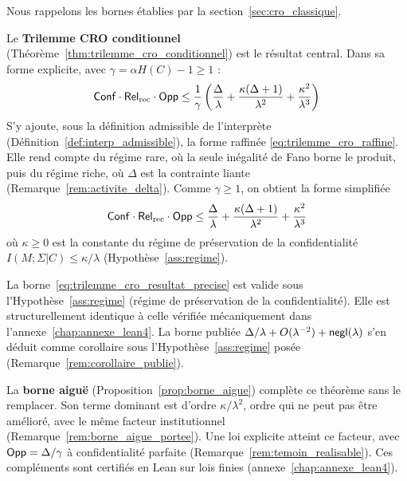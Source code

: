 \begin{sloppypar}
Nous rappelons les bornes \'etablies par la
section~\ref{sec:cro_classique}.

Le \textbf{Trilemme CRO conditionnel}
(Th\'eor\`eme~\ref{thm:trilemme_cro_conditionnel}) est le r\'esultat
central. Dans sa forme explicite, avec $\gamma = \alpha H(C) - 1 \geq 1$ :
\begin{equation}
\mathsf{Conf} \cdot \mathsf{Rel}_{\mathrm{rec}} \cdot \mathsf{Opp} \leq \frac{1}{\gamma}\left(\frac{\Delta}{\lambda} + \frac{\kappa(\Delta+1)}{\lambda^2} + \frac{\kappa^2}{\lambda^3}\right)
\label{eq:trilemme_cro_resultat_precise}
\end{equation}
S'y ajoute, sous la d\'efinition admissible de l'interpr\`ete
(D\'efinition~\ref{def:interp_admissible}), la forme raffin\'ee
\eqref{eq:trilemme_cro_raffine}. Elle rend compte du r\'egime \og rare\fg{}, o\`u la seule in\'egalit\'e de Fano
borne le produit, puis du r\'egime \og riche\fg{}, o\`u $\Delta$ est la contrainte liante
(Remarque~\ref{rem:activite_delta}).
Comme $\gamma \geq 1$, on obtient la forme simplifi\'ee
\begin{equation}
\mathsf{Conf} \cdot \mathsf{Rel}_{\mathrm{rec}} \cdot \mathsf{Opp} \leq \frac{\Delta}{\lambda} + \frac{\kappa(\Delta+1)}{\lambda^2} + \frac{\kappa^2}{\lambda^3}
\label{eq:trilemme_cro_simplifie_precise}
\end{equation}
o\`u $\kappa \geq 0$ est la constante du r\'egime de pr\'eservation de la
confidentialit\'e $I(M;\Sigma|C) \leq \kappa/\lambda$
(Hypoth\`ese~\ref{ass:regime}).

\begin{remark}
\label{rem:portee_borne_precisee}
La borne~\eqref{eq:trilemme_cro_resultat_precise} est valide
sous l'Hypoth\`ese~\ref{ass:regime} (r\'egime de pr\'eservation
de la confidentialit\'e). Elle est structurellement identique \`a celle
v\'erifi\'ee m\'ecaniquement dans l'annexe~\ref{chap:annexe_lean4}. La borne
publi\'ee $\Delta/\lambda + O(\lambda^{-2}) + \mathsf{negl}(\lambda)$ s'en d\'eduit comme
corollaire sous l'Hypoth\`ese~\ref{ass:regime} pos\'ee (Remarque~\ref{rem:corollaire_publie}).
\end{remark}

La \textbf{borne aigu\"e} (Proposition~\ref{prop:borne_aigue}) compl\`ete ce th\'eor\`eme
sans le remplacer. Son terme dominant est d'ordre $\kappa/\lambda^2$, ordre qui ne peut
pas \^etre am\'elior\'e, avec le m\^eme facteur institutionnel
(Remarque~\ref{rem:borne_aigue_portee}). Une loi explicite atteint ce facteur, avec
$\mathsf{Opp} = \Delta/\gamma$ \`a confidentialit\'e parfaite (Remarque~\ref{rem:temoin_realisable}).
Ces compl\'ements sont certifi\'es en Lean sur lois finies (annexe~\ref{chap:annexe_lean4}).


\end{sloppypar}
